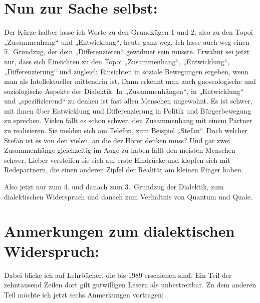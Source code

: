 \documentclass[11pt,a4paper]{article}
\begin{document}
\section{Nun zur Sache selbst:}

Der Kürze halber lasse ich Worte zu den Grundzügen 1 und 2, also zu den Topoi
„Zusammenhang“ und „Entwicklung“, heute ganz weg. Ich lasse auch weg einen
5.~Grundzug, der dem „Differenzieren“ gewidmet sein müsste. Erwähnt sei jetzt
nur, dass sich Einsichten zu den Topoi „Zusammenhang“, „Entwicklung“,
„Differenzierung“ und zugleich Einsichten in soziale Bewegungen ergeben, wenn
man als Intellektueller mittendrin ist. Dann erkennt man auch gnoseologische
und soziologische Aspekte der Dialektik. In „Zusammenhängen“, in „Entwicklung“
und „spezifizierend“ zu denken ist fast allen Menschen ungewohnt. Es ist
schwer, mit ihnen über Entwicklung und Differenzierung in Politik und
Bürgerbewegung zu sprechen. Vielen fällt es schon schwer, den Zusammenhang mit
einem Partner zu realisieren. Sie melden sich am Telefon, zum Beispiel
„Stefan“. Doch welcher Stefan ist es von den vielen, an die der Hörer denken
muss? Und gar zwei Zusammenhänge gleichzeitig im Auge zu haben fällt den
meisten Menschen schwer. Lieber versteifen sie sich auf erste Eindrücke und
klopfen sich mit Redepartnern, die einen anderen Zipfel der Realität am
kleinen Finger haben.

Also jetzt nur zum 4. und danach zum 3.~Grundzug der Dialektik, zum
dialektischen Widerspruch und danach zum Verhältnis von Quantum und Quale.

\section{Anmerkungen zum dialektischen Widerspruch:}

Dabei blicke ich auf Lehrbücher, die bis 1989 erschienen sind. Ein Teil der
zehntausend Zeilen dort gilt gutwilligen Lesern als unbestreitbar. Zu dem
anderen Teil möchte ich jetzt sechs Anmerkungen vortragen:
\end{document}
